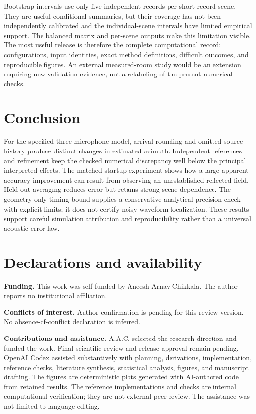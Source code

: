 \documentclass[10pt,a4paper,twocolumn]{article}
\begin{document}
Bootstrap intervals use only five independent records per short-record scene. They are useful conditional summaries, but their coverage has not been independently calibrated and the individual-scene intervals have limited empirical support. The balanced matrix and per-scene outputs make this limitation visible. The most useful release is therefore the complete computational record: configurations, input identities, exact method definitions, difficult outcomes, and reproducible figures. An external measured-room study would be an extension requiring new validation evidence, not a relabeling of the present numerical checks.

\section{Conclusion}
For the specified three-microphone model, arrival rounding and omitted source history produce distinct changes in estimated azimuth. Independent references and refinement keep the checked numerical discrepancy well below the principal interpreted effects. The matched startup experiment shows how a large apparent accuracy improvement can result from observing an unestablished reflected field. Held-out averaging reduces error but retains strong scene dependence. The geometry-only timing bound supplies a conservative analytical precision check with explicit limits; it does not certify noisy waveform localization. These results support careful simulation attribution and reproducibility rather than a universal acoustic error law.

\section*{Declarations and availability}
\textbf{Funding.} This work was self-funded by Aneesh Arnav Chikkala. The author reports no institutional affiliation.

\textbf{Conflicts of interest.} Author confirmation is pending for this review version. No absence-of-conflict declaration is inferred.

\textbf{Contributions and assistance.} A.A.C. selected the research direction and funded the work. Final scientific review and release approval remain pending. OpenAI Codex assisted substantively with planning, derivations, implementation, reference checks, literature synthesis, statistical analysis, figures, and manuscript drafting. The figures are deterministic plots generated with AI-authored code from retained results. The reference implementations and checks are internal computational verification; they are not external peer review. The assistance was not limited to language editing.
\end{document}
